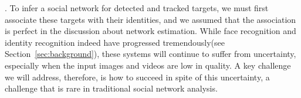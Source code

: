






. To infer a social network for detected and tracked targets, we must first associate these targets with their identities, and we assumed that the association is perfect in the discussion about network estimation. While face recognition and identity recognition indeed have progressed tremendously(see Section~\ref{sec:background}), these systems will continue to suffer from uncertainty, especially when the input images and videos are low in quality. A key challenge we will address, therefore, is how to succeed in spite of this uncertainty, a challenge that is rare in traditional social network analysis. 

